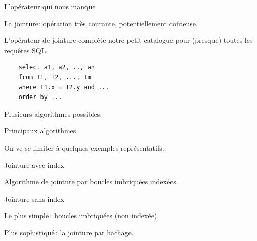 
\begin{frame}[fragile]{L'opérateur qui nous manque}

La jointure: opération très courante, potentiellement coûteuse.

\vfill

L'opérateur de jointure complète notre petit catalogue pour (presque) toutes 
les requêtes SQL.

\vfill

\begin{verbatim}
    select a1, a2, .., an
    from T1, T2, ..., Tm
    where T1.x = T2.y and ... 
    order by ...
\end{verbatim}

\vfill

Plusieurs algorithmes possibles.


\end{frame}

\begin{frame}{Principaux algorithmes}

On ve se limiter à quelques exemples représentatifs:

\vfill


\alert{Jointure avec index}

\begin{redbullet}

  \item Algorithme de jointure par boucles imbriquées indexées.

\end{redbullet}

\vfill

\alert{Jointure sans index}

\vfill
\begin{blocgauche}
\begin{redbullet}

  \item Le plus simple\,: \alert{boucles imbriquées (non indexée)}.

   \item Plus sophistiqué\,: la \alert{jointure par hachage}.
\end{redbullet}
\end{blocgauche}
\end{frame}

